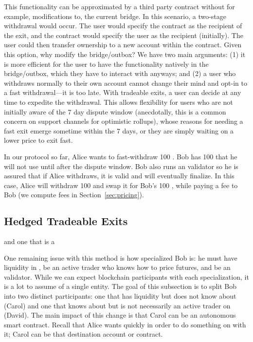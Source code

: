 

This functionality can be approximated by a third party \layerone contract without for example, modifications to, the current \arb bridge. In this scenario, a two-stage withdrawal would occur. The user would specify the contract as the recipient of the exit, and the contract would specify the user as the recipient (initially). The user could then transfer ownership to a new account within the contract. Given this option, why modify the bridge/outbox? We have two main arguments: (1) it is more efficient for the user to have the functionality natively in the bridge/outbox, which they have to interact with anyways; and (2) a user who withdraws normally to their own account cannot change their mind and opt-in to a fast withdrawal---it is too late. With tradeable exits, a user can decide at any time to expedite the withdrawal. This allows flexibility for users who are not initially aware of the 7 day dispute window (anecdotally, this is a common concern on support channels for optimistic rollups), whose reasons for needing a fast exit emerge sometime within the 7 days, or they are simply waiting on a lower price to exit fast.

In our protocol so far, Alice wants to fast-withdraw 100 \ethtwo. Bob has 100 \ethone that he will not use until after the dispute window. Bob also runs an \layertwo validator so he is assured that if Alice withdraws, it is valid and will eventually finalize. In this case, Alice will withdraw 100 \ethxx and swap it for Bob's 100 \ethone, while paying a fee to Bob (we compute fees in Section~\ref{sec:pricing}).  

\subsection{Hedged Tradeable Exits}
\label{sec:PM}and one that is a 

One remaining issue with this method is how specialized Bob is: he must have liquidity in \ethone, be an active trader who knows how to price futures, and be an \layertwo validator. While we can expect blockchain participants with each specialization, it is a lot to assume of a single entity. The goal of this subsection is to split Bob into two distinct participants: one that has \ethone liquidity but does not know about \layertwo (Carol) and one that knows about \layertwo but is not necessarily an active trader on \layerone (David). The main impact of this change is that Carol can be an autonomous \layerone smart contract. Recall that Alice wants \ethone quickly in order to do something on \layerone with it; Carol can be that destination account or contract.

